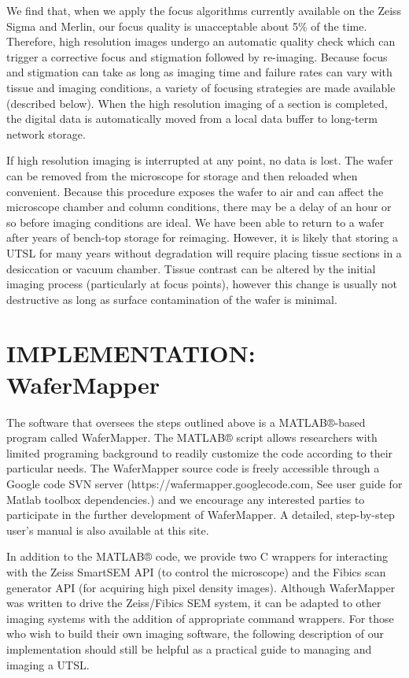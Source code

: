 \documentclass{article}
\begin{document}
We find that, when we apply the focus algorithms currently available on the Zeiss Sigma and Merlin, our focus quality is unacceptable about 5\% of the time. Therefore, high resolution images undergo an automatic quality check which can trigger a corrective focus and stigmation followed by re-imaging. Because focus and stigmation can take as long as imaging time and failure rates can vary with tissue and imaging conditions, a variety of focusing strategies are made available (described below). When the high resolution imaging of a section is completed, the digital data is automatically moved from a local data buffer to long-term network storage.

If high resolution imaging is interrupted at any point, no data is lost. The wafer can be removed from the microscope for storage and then reloaded when convenient. Because this procedure exposes the wafer to air and can affect the microscope chamber and column conditions, there may be a delay of an hour or so before imaging conditions are ideal. We have been able to return to a wafer after years of bench-top storage for reimaging. However, it is likely that storing a UTSL for many years without degradation will require placing tissue sections in a desiccation or vacuum chamber. Tissue contrast can be altered by the initial imaging process (particularly at focus points), however this change is usually not destructive as long as surface contamination of the wafer is minimal.

\section*{IMPLEMENTATION: WaferMapper}

The software that oversees the steps outlined above is a MATLAB®-based program called WaferMapper. The MATLAB® script allows researchers with limited programing background to readily customize the code according to their particular needs. The WaferMapper source code is freely accessible through a Google code SVN server (https://wafermapper.googlecode.com, See user guide for Matlab toolbox dependencies.) and we encourage any interested parties to participate in the further development of WaferMapper. A detailed, step-by-step user’s manual is also available at this site.

In addition to the MATLAB® code, we provide two C wrappers for interacting with the Zeiss SmartSEM API (to control the microscope) and the Fibics scan generator API (for acquiring high pixel density images). Although WaferMapper was written to drive the Zeiss/Fibics SEM system, it can be adapted to other imaging systems with the addition of appropriate command wrappers. For those who wish to build their own imaging software, the following description of our implementation should still be helpful as a practical guide to managing and imaging a UTSL.
\end{document}
